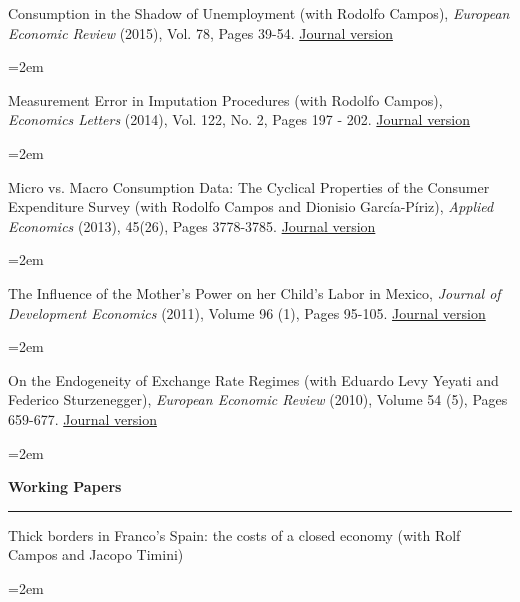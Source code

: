 \documentclass[12pt]{article}
\newcommand{\sepspace}{\vspace*{1em}}		%
\newcommand{\NewPart}[1]{ \vspace*{0.4cm} \noindent \large \textbf{#1}
\par \normalsize \normalfont \vspace*{-0.5cm} \noindent\rule{\textwidth}{1.8pt} \vspace*{-0.75cm} }
\newcommand{\EducationEntry}[4]{
		\noindent #1 \hfill      %
		\noindent #2 %
		\noindent \textit{#3} \par        %
		\noindent\hangindent=2em\hangafter=0  #4 %
		\normalsize \par}
\begin{document}

\vspace*{-0.25cm}

\EducationEntry{Consumption in the Shadow of Unemployment (with Rodolfo Campos), \textit{European Economic Review} (2015), Vol. 78, Pages 39-54.}{\href{https://www.sciencedirect.com/science/article/abs/pii/S0014292115000628}{Journal version}}{}{}

\vspace*{-0.25cm}

\EducationEntry{Measurement Error in Imputation Procedures (with Rodolfo Campos), \textit{Economics Letters} (2014), Vol. 122, No. 2, Pages 197 - 202.}{\href{https://ideas.repec.org/a/eee/ecolet/v122y2014i2p197-202.html}{Journal version}}{}{}

\vspace*{-0.25cm}

\EducationEntry{Micro vs. Macro Consumption Data: The Cyclical Properties of the Consumer Expenditure Survey (with Rodolfo Campos and Dionisio García-Píriz), \textit{Applied Economics} (2013), 45(26), Pages 3778-3785.}{\href{https://www.tandfonline.com/doi/full/10.1080/00036846.2012.732689}{Journal version}}{}{}

\vspace*{-0.25cm}

\EducationEntry{The Influence of the Mother's Power on her Child's Labor in Mexico, \textit{Journal of Development Economics} (2011), Volume 96 (1), Pages 95-105.}{\href{https://www.sciencedirect.com/science/article/abs/pii/S0304387810000738}{Journal version}}{}{}

\vspace*{-0.25cm}

\EducationEntry{On the Endogeneity of Exchange Rate Regimes (with Eduardo Levy Yeyati and Federico Sturzenegger), \textit{European Economic Review} (2010), Volume 54 (5), Pages 659-677.}{\href{https://www.sciencedirect.com/science/article/abs/pii/S0014292109001251}{Journal version}}{}{}

\vspace*{-0.5cm}
\NewPart{Working Papers}{}
\vspace*{0.25cm}

\EducationEntry{Thick borders in Franco’s Spain: the costs of a closed economy (with Rolf Campos and Jacopo Timini)}{}{}{}
\vspace*{-0.25cm}
\end{document}
